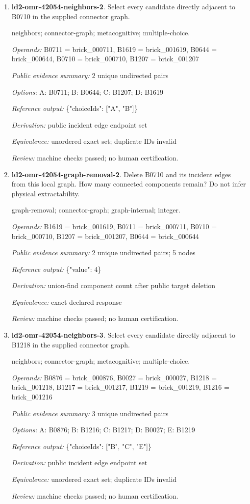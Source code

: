 \begin{enumerate}
\item \textbf{ld2-omr-42054-neighbors-2}. Select every candidate directly adjacent to B0710 in the supplied connector graph.
\par{\small neighbors; connector-graph; metacognitive; multiple-choice.\par\textit{Operands:} B0711 = brick\_000711, B1619 = brick\_001619, B0644 = brick\_000644, B0710 = brick\_000710, B1207 = brick\_001207\par\textit{Public evidence summary:} 2 unique undirected pairs\par\textit{Options:} A: B0711; B: B0644; C: B1207; D: B1619\par\textit{Reference output:} \{"choiceIds": ["A", "B"]\}\par\textit{Derivation:} public incident edge endpoint set\par\textit{Equivalence:} unordered exact set; duplicate IDs invalid\par\textit{Review:} machine checks passed; no human certification.}
\item \textbf{ld2-omr-42054-graph-removal-2}. Delete B0710 and its incident edges from this local graph. How many connected components remain? Do not infer physical extractability.
\par{\small graph-removal; connector-graph; graph-internal; integer.\par\textit{Operands:} B1619 = brick\_001619, B0711 = brick\_000711, B0710 = brick\_000710, B1207 = brick\_001207, B0644 = brick\_000644\par\textit{Public evidence summary:} 2 unique undirected pairs; 5 nodes\par\textit{Reference output:} \{"value": 4\}\par\textit{Derivation:} union-find component count after public target deletion\par\textit{Equivalence:} exact declared response\par\textit{Review:} machine checks passed; no human certification.}
\item \textbf{ld2-omr-42054-neighbors-3}. Select every candidate directly adjacent to B1218 in the supplied connector graph.
\par{\small neighbors; connector-graph; metacognitive; multiple-choice.\par\textit{Operands:} B0876 = brick\_000876, B0027 = brick\_000027, B1218 = brick\_001218, B1217 = brick\_001217, B1219 = brick\_001219, B1216 = brick\_001216\par\textit{Public evidence summary:} 3 unique undirected pairs\par\textit{Options:} A: B0876; B: B1216; C: B1217; D: B0027; E: B1219\par\textit{Reference output:} \{"choiceIds": ["B", "C", "E"]\}\par\textit{Derivation:} public incident edge endpoint set\par\textit{Equivalence:} unordered exact set; duplicate IDs invalid\par\textit{Review:} machine checks passed; no human certification.}

\end{enumerate}
